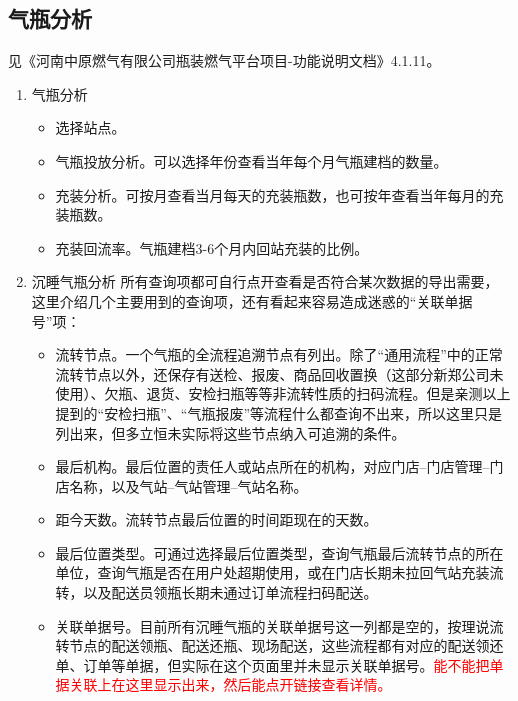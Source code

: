 \documentclass[UTF8]{ctexart}
\begin{document}
\subsection{气瓶分析}

见《河南中原燃气有限公司瓶装燃气平台项目-功能说明文档》4.1.11。

\begin{enumerate}
	\item 气瓶分析
	
	\begin{itemize}
		
		\item 选择站点。
		
		\item 气瓶投放分析。可以选择年份查看当年每个月气瓶建档的数量。
		
		\item 充装分析。可按月查看当月每天的充装瓶数，也可按年查看当年每月的充装瓶数。
		
		\item 充装回流率。气瓶建档3-6个月内回站充装的比例。
		
	\end{itemize}

	\item 沉睡气瓶分析
	所有查询项都可自行点开查看是否符合某次数据的导出需要，这里介绍几个主要用到的查询项，还有看起来容易造成迷惑的“关联单据号”项：
	\begin{itemize}
		
		\item 流转节点。一个气瓶的全流程追溯节点有列出。除了“通用流程”中的正常流转节点以外，还保存有送检、报废、商品回收置换（这部分新郑公司未使用）、欠瓶、退货、安检扫瓶等等非流转性质的扫码流程。但是亲测以上提到的“安检扫瓶”、“气瓶报废”等流程什么都查询不出来，所以这里只是列出来，但多立恒未实际将这些节点纳入可追溯的条件。
				
		\item 最后机构。最后位置的责任人或站点所在的机构，对应门店--门店管理--门店名称，以及气站--气站管理--气站名称。
		
		\item 距今天数。流转节点最后位置的时间距现在的天数。
		
		\item 最后位置类型。可通过选择最后位置类型，查询气瓶最后流转节点的所在单位，查询气瓶是否在用户处超期使用，或在门店长期未拉回气站充装流转，以及配送员领瓶长期未通过订单流程扫码配送。
		
		\item 关联单据号。目前所有沉睡气瓶的关联单据号这一列都是空的，按理说流转节点的配送领瓶、配送还瓶、现场配送，这些流程都有对应的配送领还单、订单等单据，但实际在这个页面里并未显示关联单据号。\textcolor{red}{能不能把单据关联上在这里显示出来，然后能点开链接查看详情。}
		

\end{itemize}
\end{enumerate}
\end{document}
